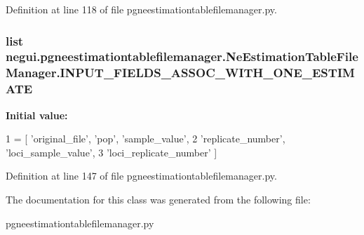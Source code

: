 Definition at line 118 of file pgneestimationtablefilemanager.\+py.

\subsubsection[{\texorpdfstring{I\+N\+P\+U\+T\+\_\+\+F\+I\+E\+L\+D\+S\+\_\+\+A\+S\+S\+O\+C\+\_\+\+W\+I\+T\+H\+\_\+\+O\+N\+E\+\_\+\+E\+S\+T\+I\+M\+A\+TE}{INPUT_FIELDS_ASSOC_WITH_ONE_ESTIMATE}}]{\setlength{\rightskip}{0pt plus 5cm}list negui.\+pgneestimationtablefilemanager.\+Ne\+Estimation\+Table\+File\+Manager.\+I\+N\+P\+U\+T\+\_\+\+F\+I\+E\+L\+D\+S\+\_\+\+A\+S\+S\+O\+C\+\_\+\+W\+I\+T\+H\+\_\+\+O\+N\+E\+\_\+\+E\+S\+T\+I\+M\+A\+TE\hspace{0.3cm}{\ttfamily [static]}}\hypertarget{classnegui_1_1pgneestimationtablefilemanager_1_1NeEstimationTableFileManager_a6f218aa5731da955c633f34caa078313}{}\label{classnegui_1_1pgneestimationtablefilemanager_1_1NeEstimationTableFileManager_a6f218aa5731da955c633f34caa078313}
{\bfseries Initial value\+:}
\begin{DoxyCode}
1 = [ \textcolor{stringliteral}{'original\_file'}, \textcolor{stringliteral}{'pop'}, \textcolor{stringliteral}{'sample\_value'},
2                                                     \textcolor{stringliteral}{'replicate\_number'}, \textcolor{stringliteral}{'loci\_sample\_value'},
3                                                     \textcolor{stringliteral}{'loci\_replicate\_number'} ]
\end{DoxyCode}


Definition at line 147 of file pgneestimationtablefilemanager.\+py.



The documentation for this class was generated from the following file\+:\begin{DoxyCompactItemize}
\item 
pgneestimationtablefilemanager.\+py\end{DoxyCompactItemize}
